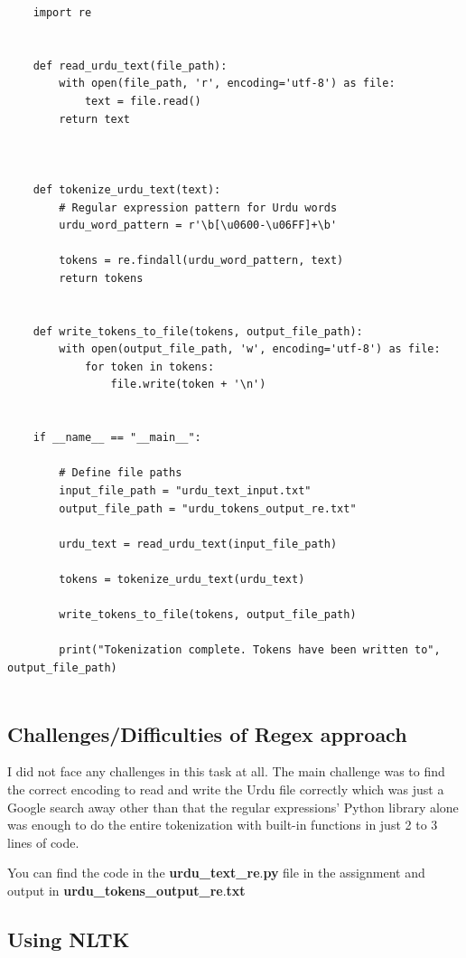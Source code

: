 \documentclass[a4paper,12pt]{article}
\begin{document}
\begin{lstlisting}
    import re


    def read_urdu_text(file_path):
        with open(file_path, 'r', encoding='utf-8') as file:
            text = file.read()
        return text
    
    
    
    def tokenize_urdu_text(text):
        # Regular expression pattern for Urdu words
        urdu_word_pattern = r'\b[\u0600-\u06FF]+\b'
    
        tokens = re.findall(urdu_word_pattern, text)
        return tokens
    
    
    def write_tokens_to_file(tokens, output_file_path):
        with open(output_file_path, 'w', encoding='utf-8') as file:
            for token in tokens:
                file.write(token + '\n')
    
    
    if __name__ == "__main__":
    
        # Define file paths
        input_file_path = "urdu_text_input.txt"
        output_file_path = "urdu_tokens_output_re.txt"
    
        urdu_text = read_urdu_text(input_file_path)
    
        tokens = tokenize_urdu_text(urdu_text)
    
        write_tokens_to_file(tokens, output_file_path)
    
        print("Tokenization complete. Tokens have been written to", output_file_path)
    
\end{lstlisting}

\subsection{Challenges/Difficulties of Regex approach}

I did not face any challenges in this task at all. The main challenge was to find the correct encoding to read and write the Urdu file correctly which was just a Google search away other than that the regular expressions’ Python library alone was enough to do the entire tokenization with built-in functions in just 2 to 3 lines of code.

You can find the code in the \textbf{urdu\_text\_re$.$py} file in the assignment and output in \textbf{urdu\_tokens\_output\_re$.$txt}


\subsection{Using NLTK}
\end{document}
